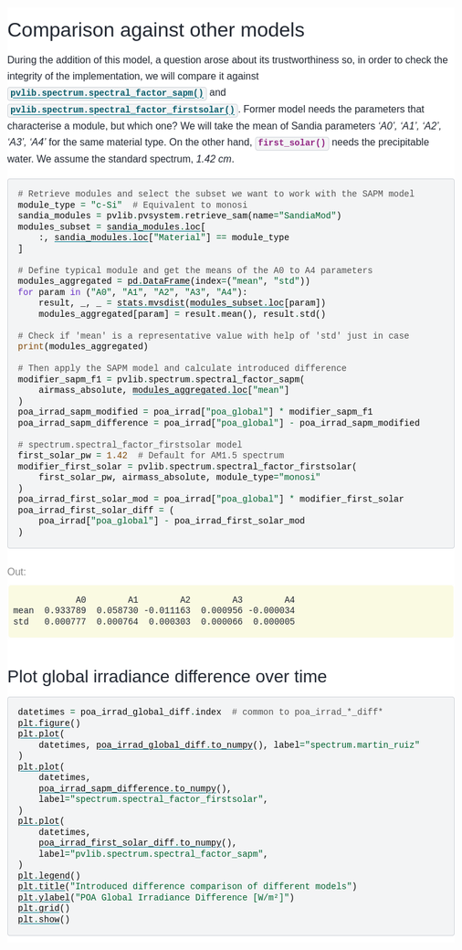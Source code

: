 \begin{myparindent}{0pt}
\includegraphics[width=\linewidth,height=0.9\textheight,keepaspectratio]{images/docs_examples_cut/mr_2.png}


\end{myparindent}
